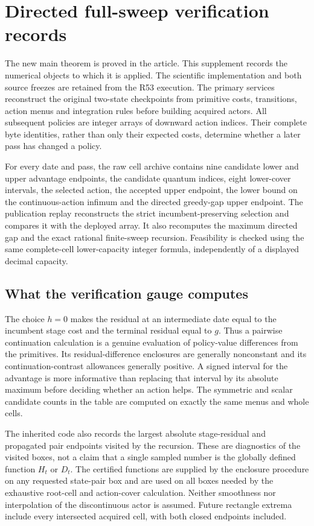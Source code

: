 \section{Directed full-sweep verification records}\label{supp:directed54}
The new main theorem is proved in the article. This supplement records the numerical objects to which it is applied. The scientific implementation and both source freezes are retained from the R53 execution. The primary services reconstruct the original two-state checkpoints from primitive costs, transitions, action menus and integration rules before building acquired actors. All subsequent policies are integer arrays of downward action indices. Their complete byte identities, rather than only their expected costs, determine whether a later pass has changed a policy.

For every date and pass, the raw cell archive contains nine candidate lower and upper advantage endpoints, the candidate quantum indices, eight lower-cover intervals, the selected action, the accepted upper endpoint, the lower bound on the continuous-action infimum and the directed greedy-gap upper endpoint. The publication replay reconstructs the strict incumbent-preserving selection and compares it with the deployed array. It also recomputes the maximum directed gap and the exact rational finite-sweep recursion. Feasibility is checked using the same complete-cell lower-capacity integer formula, independently of a displayed decimal capacity.




\subsection{What the verification gauge computes}
The choice $h=0$ makes the residual at an intermediate date equal to the incumbent stage cost and the terminal residual equal to $g$. Thus a pairwise continuation calculation is a genuine evaluation of policy-value differences from the primitives. Its residual-difference enclosures are generally nonconstant and its continuation-contrast allowances generally positive. A signed interval for the advantage is more informative than replacing that interval by its absolute maximum before deciding whether an action helps. The symmetric and scalar candidate counts in the table are computed on exactly the same menus and whole cells.

The inherited code also records the largest absolute stage-residual and propagated pair endpoints visited by the recursion. These are diagnostics of the visited boxes, not a claim that a single sampled number is the globally defined function $H_t$ or $D_t$. The certified functions are supplied by the enclosure procedure on any requested state-pair box and are used on all boxes needed by the exhaustive root-cell and action-cover calculation. Neither smoothness nor interpolation of the discontinuous actor is assumed. Future rectangle extrema include every intersected acquired cell, with both closed endpoints included.

